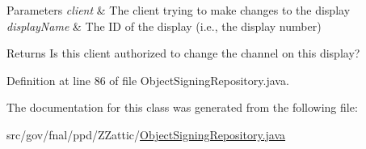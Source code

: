 \begin{DoxyParams}{Parameters}
{\em client} & The client trying to make changes to the display \\
\hline
{\em display\-Name} & The I\-D of the display (i.\-e., the display number) \\
\hline
\end{DoxyParams}
\begin{DoxyReturn}{Returns}
Is this client authorized to change the channel on this display? 
\end{DoxyReturn}


Definition at line 86 of file Object\-Signing\-Repository.\-java.



The documentation for this class was generated from the following file\-:\begin{DoxyCompactItemize}
\item 
src/gov/fnal/ppd/\-Z\-Zattic/\hyperlink{ObjectSigningRepository_8java}{Object\-Signing\-Repository.\-java}\end{DoxyCompactItemize}
